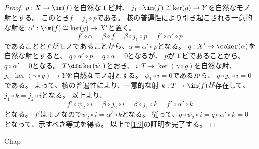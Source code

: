 \documentclass[uplatex,dvipdfmx]{jsarticle}
\begin{document}
\begin{proof}
  \(p:X\to \im(f)\)を自然なエピ射、
  \(j_1:\im(f)\cong \ker(g)\to Y\)を自然なモノ射とする。
  このとき\(f = j_1\circ p\)である。
  核の普遍性により引き起こされる一意的な射を
  \(\alpha' : \im(f)\cong \ker(g)\to X'\)と置く。
  \[
  f'\circ \alpha
  = \beta \circ f
  = \beta \circ j_1 \circ p
  = f'\circ \alpha' \circ p
  \]
  であることと\(f'\)がモノであることから、\(\alpha = \alpha'\circ p\)となる。
  \(q:X'\to \coker(\alpha)\)を自然な射とすると、
  \(q\circ \alpha' \circ p = q\circ \alpha = 0\)となるが、
  \(p\)がエピであることから、\(q\circ \alpha' = 0\)となる。
  \(T\dfn \ker(\psi_1)\)とおき、
  \(i:T\to \ker(\gamma\circ g)\)を自然な射、
  \(j_2:\ker(\gamma\circ g) \to Y\)を自然なモノ射とする。
  \(\psi_1\circ i = 0\)であるから、
  \(g\circ j_2\circ i = 0\)である。
  よって、核の普遍性により、一意的な射
  \(k:T\to \im(f)\)が存在して、
  \(j_1\circ k = j_2\circ i\)となる。
  以上より、
  \[
  f' \circ \psi_2 \circ i
  = \beta\circ j_2\circ i
  = \beta\circ j_1\circ k
  = f'\circ \alpha' \circ k
  \]
  となる。
  \(f'\)はモノなので\(\psi_2\circ i = \alpha'\circ k\)となる。
  従って、\(q\circ \psi_2\circ i = q\circ \alpha' \circ k = 0\)
  となって、示すべき等式を得る。
  以上で\autoref{1.9}の証明を完了する。
\end{proof}



\ifcsname Chap\endcsname\else
\printbibliography
\end{document}
